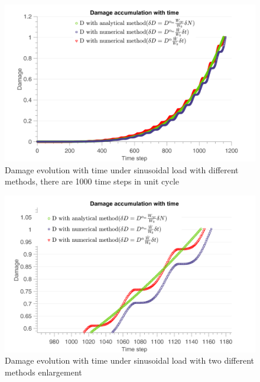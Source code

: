 \begin{figure}[!h]
\centering
\includegraphics[width=\textwidth]{figures//D_3methods2_100steps.png} 
\caption{Damage evolution with time under sinusoidal load with different methods, there are 1000 time steps in unit cycle}
\label{damsin1000}
\end{figure}

\begin{figure}[!h]
\centering
\includegraphics[width=\textwidth]{figures//D_3methods_100steps_enlarge.png} 
\caption{Damage evolution with time under sinusoidal load with two different methods enlargement}
\label{damsinenglarge}
\end{figure}

